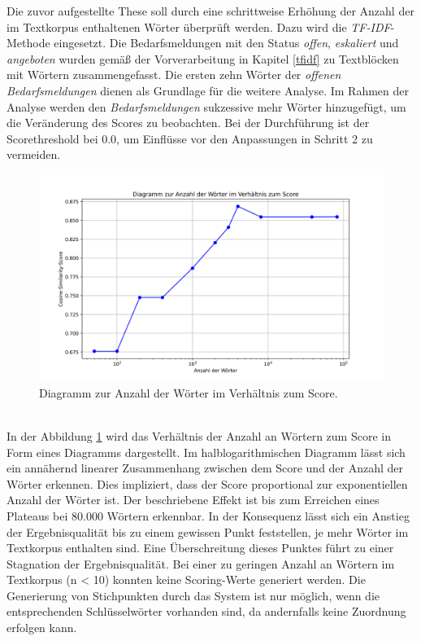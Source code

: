 Die zuvor aufgestellte These soll durch eine schrittweise Erhöhung der Anzahl der im Textkorpus enthaltenen Wörter überprüft werden. Dazu wird die \emph{TF-IDF}-Methode eingesetzt. Die Bedarfsmeldungen mit den Status \emph{offen}, \emph{eskaliert} und \emph{angeboten} wurden gemäß der Vorverarbeitung in Kapitel \ref{tfidf} zu Textblöcken mit Wörtern zusammengefasst. Die ersten zehn Wörter der \emph{offenen Bedarfsmeldungen} dienen als Grundlage für die weitere Analyse. Im Rahmen der Analyse werden den \emph{Bedarfsmeldungen} sukzessive mehr Wörter hinzugefügt, um die Veränderung des Scores zu beobachten. Bei der Durchführung ist der Scorethreshold bei 0.0, um Einflüsse vor den Anpassungen in Schritt 2 zu vermeiden.
\begin{figure}[H]
	\centering  
	\includegraphics[width=\linewidth]{plot/e1-woerter-score.png}
	\caption{Diagramm zur Anzahl der Wörter im Verhältnis zum Score.}
	\label{fig:woertervsscore}
\end{figure}\mbox{} \\
In der Abbildung \ref{fig:woertervsscore} wird das Verhältnis der Anzahl an Wörtern zum Score in Form eines Diagramms dargestellt. Im halblogarithmischen Diagramm lässt sich ein annähernd linearer Zusammenhang zwischen dem Score und der Anzahl der Wörter erkennen. Dies impliziert, dass der Score proportional zur exponentiellen Anzahl der Wörter ist. Der beschriebene Effekt ist bis zum Erreichen eines Plateaus bei 80.000 Wörtern erkennbar. In der Konsequenz lässt sich ein Anstieg der Ergebnisqualität bis zu einem gewissen Punkt feststellen, je mehr Wörter im Textkorpus enthalten sind. Eine Überschreitung dieses Punktes führt zu einer Stagnation der Ergebnisqualität. Bei einer zu geringen Anzahl an Wörtern im Textkorpus (n < 10) konnten keine Scoring-Werte generiert werden. Die Generierung von Stichpunkten durch das System ist nur möglich, wenn die entsprechenden Schlüsselwörter vorhanden sind, da andernfalls keine Zuordnung erfolgen kann.
